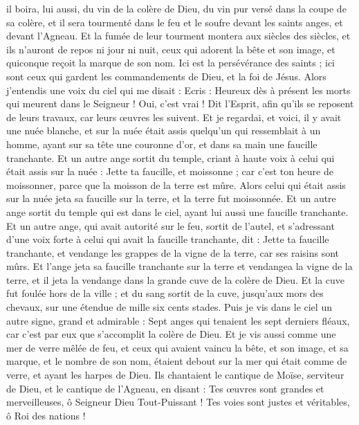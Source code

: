 \begin{multicols}{2}
il boira, lui aussi, du vin de la colère de Dieu, du vin pur versé dans la coupe de sa colère, et il sera tourmenté dans le feu et le soufre devant les saints anges, et devant l'Agneau.
Et la fumée de leur tourment montera aux siècles des siècles, et ils n'auront de repos ni jour ni nuit, ceux qui adorent la bête et son image, et quiconque reçoit la marque de son nom.
Ici est la persévérance des saints ; ici sont ceux qui gardent les commandements de Dieu, et la foi de Jésus.
Alors j'entendis une voix du ciel qui me disait : Ecris : Heureux dès à présent les morts qui meurent dans le Seigneur ! Oui, c'est vrai ! Dit l'Esprit, afin qu'ils se reposent de leurs travaux, car leurs œuvres les suivent.
Et je regardai, et voici, il y avait une nuée blanche, et sur la nuée était assis quelqu'un qui ressemblait à un homme, ayant sur sa tête une couronne d'or, et dans sa main une faucille tranchante.
Et un autre ange sortit du temple, criant à haute voix à celui qui était assis sur la nuée : Jette ta faucille, et moissonne ; car c'est ton heure de moissonner, parce que la moisson de la terre est mûre.
Alors celui qui était assis sur la nuée jeta sa faucille sur la terre, et la terre fut moissonnée.
Et un autre ange sortit du temple qui est dans le ciel, ayant lui aussi une faucille tranchante.
Et un autre ange, qui avait autorité sur le feu, sortit de l'autel, et s'adressant d'une voix forte à celui qui avait la faucille tranchante, dit : Jette ta faucille tranchante, et vendange les grappes de la vigne de la terre, car ses raisins sont mûrs.
Et l'ange jeta sa faucille tranchante sur la terre et vendangea la vigne de la terre, et il jeta la vendange dans la grande cuve de la colère de Dieu.
Et la cuve fut foulée hors de la ville ; et du sang sortit de la cuve, jusqu'aux mors des chevaux, sur une étendue de mille six cents stades.
\VerseOne{}Puis je vis dans le ciel un autre signe, grand et admirable : Sept anges qui tenaient les sept derniers fléaux, car c'est par eux que s'accomplit la colère de Dieu.
Et je vis aussi comme une mer de verre mêlée de feu, et ceux qui avaient vaincu la bête, et son image, et sa marque, et le nombre de son nom, étaient debout sur la mer qui était comme de verre, et ayant les harpes de Dieu.
Ils chantaient le cantique de Moïse, serviteur de Dieu, et le cantique de l'Agneau, en disant : Tes œuvres sont grandes et merveilleuses, ô Seigneur Dieu Tout-Puissant ! Tes voies sont justes et véritables, ô Roi des nations !

\end{multicols}
